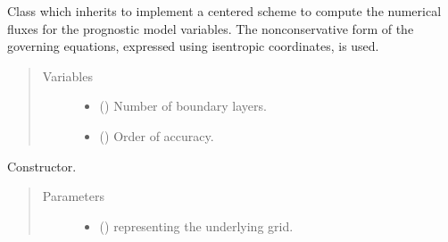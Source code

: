 \documentclass[letterpaper,10pt,english]{sphinxmanual}
\begin{document}
\begin{fulllineitems}
\label{\detokenize{api:tasmania.dycore.flux_isentropic_nonconservative_centered.FluxIsentropicNonconservativeCentered}}
Class which inherits  to implement a
centered scheme to compute the numerical fluxes for the prognostic model variables.
The nonconservative form of the governing equations, expressed using isentropic coordinates, is used.
\begin{quote}\begin{description}
\item[{Variables}] \leavevmode\begin{itemize}
\item {} 
{\hyperref[\detokenize{api:tasmania.dycore.prognostic_isentropic.PrognosticIsentropic.nb}]{}} () \textendash{} Number of boundary layers.

\item {} 
 () \textendash{} Order of accuracy.

\end{itemize}

\end{description}\end{quote}

\begin{fulllineitems}
\label{\detokenize{api:tasmania.dycore.flux_isentropic_nonconservative_centered.FluxIsentropicNonconservativeCentered.__init__}}
Constructor.
\begin{quote}\begin{description}
\item[{Parameters}] \leavevmode\begin{itemize}
\item {} 
 () \textendash{} {\hyperref[\detokenize{api:tasmania.grids.grid_xyz.GridXYZ}]{}} representing the underlying grid.


\end{itemize}
\end{description}
\end{quote}
\end{fulllineitems}
\end{fulllineitems}
\end{document}
